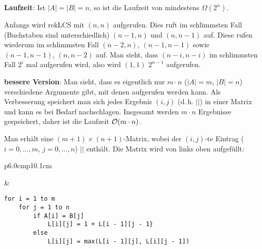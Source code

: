 \textbf{Laufzeit}: Ist $|A| = |B| = n$, so ist die Laufzeit von
 mindestens $\Omega(2^n)$.

\begin{Beweis}
    Anfangs wird rekLCS mit $(n, n)$ aufgerufen.
    Dies ruft im schlimmsten Fall (Buchstaben sind unterschiedlich)
    $(n - 1, n)$ und $(n, n - 1)$ auf.
    Diese rufen wiederum im schlimmsten Fall
    $(n - 2, n)$, $(n - 1, n - 1)$ sowie $(n - 1, n - 1)$, $(n, n - 2)$ auf.
    Man sieht, dass $(n - i, n - i)$ im schlimmsten Fall $2^i$ mal aufgerufen
    wird, also wird $(1, 1)$ $2^{n-1}$ aufgerufen.
\end{Beweis}

\linie

\textbf{bessere Version}:
Man sieht, dass es eigentlich nur $m \cdot n$ ($|A| = m$, $|B| = n$)
verschiedene Argumente gibt, mit denen  aufgerufen werden kann.
Als Verbesserung speichert man sich jedes Ergebnis
$(i, j)$ (d.\,h. $|$$|$)
in einer Matrix und kann es bei Bedarf nachschlagen.
Insgesamt werden $m \cdot n$ Ergebnisse gespeichert, daher ist die Laufzeit
$\mathcal{O}(m \cdot n)$.

Man erhält eine $(m + 1) \times (n + 1)$-Matrix, wobei der $(i, j)$-te
Eintrag ($i = 0, \dotsc, m$, $j = 0, \dotsc, n$)
$|$$|$ enthält.
Die Matrix wird von links oben aufgefüllt:

\begin{tabular}{p{6.0cm}p{10.1cm}}
    \begin{minipage}[c]{6.0cm}
    \end{minipage} &
    \begin{minipage}[c]{10.1cm}
\begin{lstlisting}
for i = 1 to m
    for j = 1 to n
        if A[i] = B[j]
            L[i][j] = 1 + L[i - 1][j - 1}
        else
            L[i][j] = max(L[i - 1][j], L[i][j - 1])
\end{lstlisting}
    \end{minipage}
\end{tabular}


